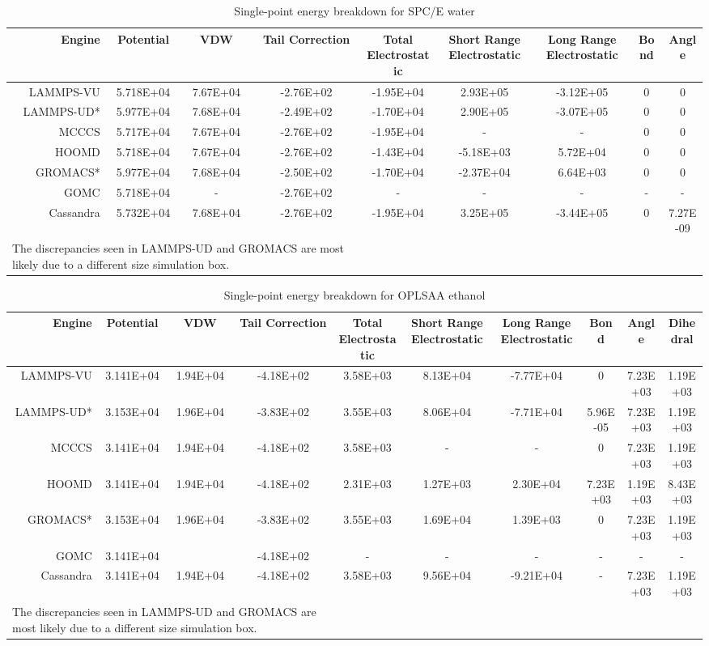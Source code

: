 \begin{table}
\caption{Single-point energy breakdown for SPC/E water}\label{tab:sp_water}
\centering
\begin{tabular}{rcccccccc}
\hline
Engine & Potential & VDW & Tail Correction & Total Electrostatic & Short Range Electrostatic & Long Range Electrostatic & Bond & Angle \\ \hline
LAMMPS-VU & 5.718E+04 & 7.67E+04 & -2.76E+02 & -1.95E+04 & 2.93E+05 & -3.12E+05 & 0 & 0 \\
LAMMPS-UD* & 5.977E+04 & 7.68E+04 & -2.49E+02 & -1.70E+04 & 2.90E+05 & -3.07E+05 & 0 & 0 \\
MCCCS & 5.717E+04 & 7.67E+04 & -2.76E+02 & -1.95E+04 & - & - & 0 & 0 \\
HOOMD & 5.718E+04 & 7.67E+04 & -2.76E+02 & -1.43E+04 & -5.18E+03 & 5.72E+04 & 0 & 0 \\
GROMACS* & 5.977E+04 & 7.68E+04 & -2.50E+02 & -1.70E+04 & -2.37E+04 & 6.64E+03 & 0 & 0 \\
GOMC & 5.718E+04 & - & -2.76E+02 & - & - & - & - & - \\
Cassandra & 5.732E+04 & 7.68E+04 & -2.76E+02 & -1.95E+04 & 3.25E+05 & -3.44E+05 & 0 & 7.27E-09 \\ \hline
\multicolumn{4}{l}{\small *The discrepancies seen in LAMMPS-UD and GROMACS are most likely due to a different size simulation box.} \\
\end{tabular}
\end{table}

\begin{table}
\caption{Single-point energy breakdown for OPLSAA ethanol}\label{tab:sp_ethanol}
\centering
\begin{tabular}{rccccccccc}
Engine & Potential & VDW & Tail Correction & Total Electrostatic & Short Range Electrostatic & Long Range Electrostatic & Bond & Angle & Dihedral \\ \hline
LAMMPS-VU & 3.141E+04 & 1.94E+04 & -4.18E+02 & 3.58E+03 & 8.13E+04 & -7.77E+04 & 0 & 7.23E+03 & 1.19E+03 \\
LAMMPS-UD* & 3.153E+04 & 1.96E+04 & -3.83E+02 & 3.55E+03 & 8.06E+04 & -7.71E+04 & 5.96E-05 & 7.23E+03 & 1.19E+03 \\
MCCCS & 3.141E+04 & 1.94E+04 & -4.18E+02 & 3.58E+03 & - & - & 0 & 7.23E+03 & 1.19E+03 \\
HOOMD & 3.141E+04 & 1.94E+04 & -4.18E+02 & 2.31E+03 & 1.27E+03 & 2.30E+04 & 7.23E+03 & 1.19E+03 & 8.43E+03 \\
GROMACS* & 3.153E+04 & 1.96E+04 & -3.83E+02 & 3.55E+03 & 1.69E+04 & 1.39E+03 & 0 & 7.23E+03 & 1.19E+03 \\
GOMC & 3.141E+04 &  & -4.18E+02 & - & - & - & - & - & - \\
Cassandra & 3.141E+04 & 1.94E+04 & -4.18E+02 & 3.58E+03 & 9.56E+04 & -9.21E+04 & - & 7.23E+03 & 1.19E+03 \\ \hline
\multicolumn{4}{l}{\small *The discrepancies seen in LAMMPS-UD and GROMACS are most likely due to a different size simulation box.}
\end{tabular}
\end{table}
